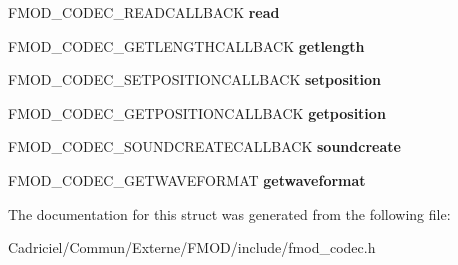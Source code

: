 \begin{DoxyCompactItemize}
\item 
F\+M\+O\+D\+\_\+\+C\+O\+D\+E\+C\+\_\+\+R\+E\+A\+D\+C\+A\+L\+L\+B\+A\+CK {\bfseries read}\hypertarget{struct_f_m_o_d___c_o_d_e_c___d_e_s_c_r_i_p_t_i_o_n_ac64375412d9cd6e73fdf0d9aea0ca37a}{}\label{struct_f_m_o_d___c_o_d_e_c___d_e_s_c_r_i_p_t_i_o_n_ac64375412d9cd6e73fdf0d9aea0ca37a}

\item 
F\+M\+O\+D\+\_\+\+C\+O\+D\+E\+C\+\_\+\+G\+E\+T\+L\+E\+N\+G\+T\+H\+C\+A\+L\+L\+B\+A\+CK {\bfseries getlength}\hypertarget{struct_f_m_o_d___c_o_d_e_c___d_e_s_c_r_i_p_t_i_o_n_a83a086b8d6537aa0c7c271fc2adb4fbf}{}\label{struct_f_m_o_d___c_o_d_e_c___d_e_s_c_r_i_p_t_i_o_n_a83a086b8d6537aa0c7c271fc2adb4fbf}

\item 
F\+M\+O\+D\+\_\+\+C\+O\+D\+E\+C\+\_\+\+S\+E\+T\+P\+O\+S\+I\+T\+I\+O\+N\+C\+A\+L\+L\+B\+A\+CK {\bfseries setposition}\hypertarget{struct_f_m_o_d___c_o_d_e_c___d_e_s_c_r_i_p_t_i_o_n_a7d60d107fe48efef977f2a883fd097be}{}\label{struct_f_m_o_d___c_o_d_e_c___d_e_s_c_r_i_p_t_i_o_n_a7d60d107fe48efef977f2a883fd097be}

\item 
F\+M\+O\+D\+\_\+\+C\+O\+D\+E\+C\+\_\+\+G\+E\+T\+P\+O\+S\+I\+T\+I\+O\+N\+C\+A\+L\+L\+B\+A\+CK {\bfseries getposition}\hypertarget{struct_f_m_o_d___c_o_d_e_c___d_e_s_c_r_i_p_t_i_o_n_a3e532db698aa1f571ddb4afb20f53682}{}\label{struct_f_m_o_d___c_o_d_e_c___d_e_s_c_r_i_p_t_i_o_n_a3e532db698aa1f571ddb4afb20f53682}

\item 
F\+M\+O\+D\+\_\+\+C\+O\+D\+E\+C\+\_\+\+S\+O\+U\+N\+D\+C\+R\+E\+A\+T\+E\+C\+A\+L\+L\+B\+A\+CK {\bfseries soundcreate}\hypertarget{struct_f_m_o_d___c_o_d_e_c___d_e_s_c_r_i_p_t_i_o_n_a9004a5424a76ae31edc173015a20233e}{}\label{struct_f_m_o_d___c_o_d_e_c___d_e_s_c_r_i_p_t_i_o_n_a9004a5424a76ae31edc173015a20233e}

\item 
F\+M\+O\+D\+\_\+\+C\+O\+D\+E\+C\+\_\+\+G\+E\+T\+W\+A\+V\+E\+F\+O\+R\+M\+AT {\bfseries getwaveformat}\hypertarget{struct_f_m_o_d___c_o_d_e_c___d_e_s_c_r_i_p_t_i_o_n_a81c4079df89138532f9c435ebd0d1f64}{}\label{struct_f_m_o_d___c_o_d_e_c___d_e_s_c_r_i_p_t_i_o_n_a81c4079df89138532f9c435ebd0d1f64}

\end{DoxyCompactItemize}


The documentation for this struct was generated from the following file\+:\begin{DoxyCompactItemize}
\item 
Cadriciel/\+Commun/\+Externe/\+F\+M\+O\+D/include/fmod\+\_\+codec.\+h\end{DoxyCompactItemize}
